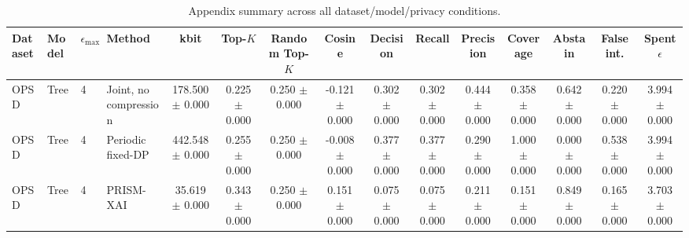 \begin{table}[t]
\caption{Appendix summary across all dataset/model/privacy conditions.}
\label{tab:appendix-conditions}
\centering
\scriptsize
\setlength{\tabcolsep}{2.5pt}
\begin{tabular}{llllccccccccccc}
\toprule
Dataset & Model & $\epsilon_{\max}$ & Method & kbit & Top-$K$ & Random Top-$K$ & Cosine & Decision & Recall & Precision & Coverage & Abstain & False int. & Spent $\epsilon$ \\
\midrule
OPSD & Tree & 4 & Joint, no compression & 178.500 $\pm$ 0.000 & 0.225 $\pm$ 0.000 & 0.250 $\pm$ 0.000 & -0.121 $\pm$ 0.000 & 0.302 $\pm$ 0.000 & 0.302 $\pm$ 0.000 & 0.444 $\pm$ 0.000 & 0.358 $\pm$ 0.000 & 0.642 $\pm$ 0.000 & 0.220 $\pm$ 0.000 & 3.994 $\pm$ 0.000 \\
OPSD & Tree & 4 & Periodic fixed-DP & 442.548 $\pm$ 0.000 & 0.255 $\pm$ 0.000 & 0.250 $\pm$ 0.000 & -0.008 $\pm$ 0.000 & 0.377 $\pm$ 0.000 & 0.377 $\pm$ 0.000 & 0.290 $\pm$ 0.000 & 1.000 $\pm$ 0.000 & 0.000 $\pm$ 0.000 & 0.538 $\pm$ 0.000 & 3.994 $\pm$ 0.000 \\
OPSD & Tree & 4 & PRISM-XAI & 35.619 $\pm$ 0.000 & 0.343 $\pm$ 0.000 & 0.250 $\pm$ 0.000 & 0.151 $\pm$ 0.000 & 0.075 $\pm$ 0.000 & 0.075 $\pm$ 0.000 & 0.211 $\pm$ 0.000 & 0.151 $\pm$ 0.000 & 0.849 $\pm$ 0.000 & 0.165 $\pm$ 0.000 & 3.703 $\pm$ 0.000 \\
\bottomrule
\end{tabular}
\end{table}
